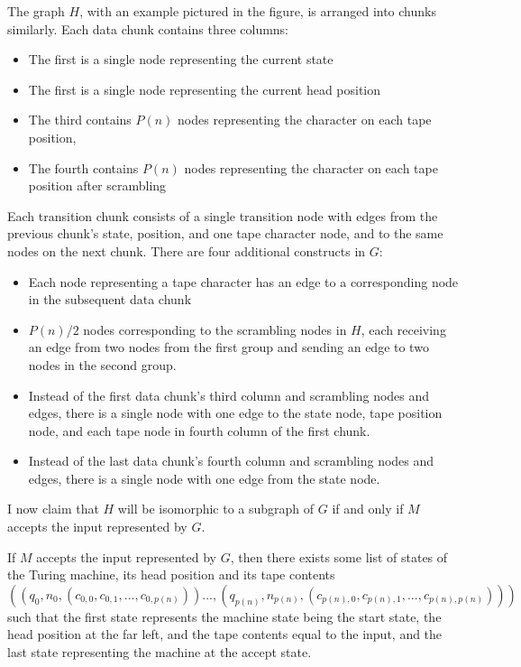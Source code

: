 \documentclass[12pt]{article}
\begin{document}
The graph $H$, with an example pictured in the figure, is arranged into chunks similarly.
Each data chunk contains three columns:
\begin{itemize}
	\item The first is a single node representing the current state
	\item The first is a single node representing the current head position
	\item The third contains $P(n)$ nodes representing the character on each tape position,
	\item The fourth contains $P(n)$ nodes representing the character on each tape position after scrambling
\end{itemize}
Each transition chunk consists of a single transition node with edges from the previous chunk's state, position, and one tape character node, and to the same nodes on the next chunk.
There are four additional constructs in $G$:
\begin{itemize}
	\item Each node representing a tape character has an edge to a corresponding node in the subsequent data chunk
	\item $P(n)/2$ nodes corresponding to the scrambling nodes in $H$, each receiving an edge from two nodes from the first group and sending an edge to two nodes in the second group.
	\item Instead of the first data chunk's third column and scrambling nodes and edges, there is a single node with one edge to the state node, tape position node, and each tape node in fourth column of the first chunk.
	\item Instead of the last data chunk's fourth column and scrambling nodes and edges, there is a single node with one edge from the state node.
\end{itemize}

\vspace{25px}

I now claim that $H$ will be isomorphic to a subgraph of $G$ if and only if $M$ accepts the input represented by $G$.

If $M$ accepts the input represented by $G$, then there exists some list of states of the Turing machine, its head position and its tape contents $((q_0, n_0, (c_{0,0}, c_{0,1}, ..., c_{0,p(n)})) ..., (q_{p(n)}, n_{p(n)}, (c_{p(n),0}, c_{p(n),1}, ..., c_{p(n),p(n)})))$ such that the first state represents the machine state being the start state, the head position at the far left, and the tape contents equal to the input, and the last state representing the machine at the accept state.
\end{document}
